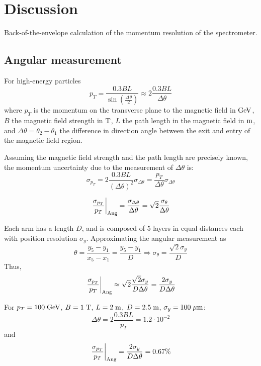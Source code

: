 \documentclass[a4paper,11pt,twoside]{article}
\begin{document}
\section{Discussion}
Back-of-the-envelope calculation of the momentum resolution of the spectrometer.

\subsection{Angular measurement}

For high-energy particles
\begin{equation}
  p_T =\frac{0.3BL}{\sin\left(\frac{\Delta\theta}{2}\right)}\approx 2\frac{0.3BL}{\Delta\theta}
\end{equation}
where $p_T$ is the momentum on the transverse plane to the magnetic
field in ${\rm GeV}$, $B$ the magnetic field strength in ${\rm T}$,
$L$ the path length in the magnetic field in ${\rm m}$, and
$\Delta\theta=\theta_{2}-\theta_{1}$ the difference in direction angle
between the exit and entry of the magnetic field region.

Assuming the magnetic field strength and the path length are precisely known,
the momentum uncertainty due to the measurement of $\Delta\theta$ is:
\begin{equation}
  \sigma_{p_T} = 2\frac{0.3BL}{\left(\Delta\theta\right)^2}\sigma_{\Delta\theta} =
    \frac{p_T}{\Delta\theta}\sigma_{\Delta\theta}
\end{equation}

\begin{equation}
  \left.\frac{\sigma_{p_T}}{p_T}\right|_{\rm Ang}= \frac{\sigma_{\Delta\theta}}{\Delta\theta} =\sqrt{2}\frac{\sigma_\theta}{\Delta\theta}
\end{equation}

Each arm has a length $D$, and is composed of 5 layers in equal distances each with position resolution $\sigma_y$.
Approximating the angular measurement as
\begin{equation}
  \theta=\frac{y_5-y_1}{x_5-x_1}=\frac{y_5-y_1}{D}\Rightarrow \sigma_\theta=\frac{\sqrt{2}\sigma_y}{D}
\end{equation}
Thus,
\begin{equation}
  \left.\frac{\sigma_{p_T}}{p_T}\right|_{\rm Ang}\approx \sqrt{2}\frac{\sqrt{2}\sigma_y}{D\Delta\theta}
  = \frac{2\sigma_y}{D\Delta\theta}
\end{equation}

For $p_T=100\;{\rm GeV}$, $B=1\;{\rm T}$, $L=2\;{\rm m}$, $D=2.5\;{\rm m}$, $\sigma_y=100\;{\rm \mu m}$:
\begin{equation}
  \Delta\theta = 2\frac{0.3BL}{p_T}=1.2\cdot 10^{-2}
\end{equation}
and
\begin{equation}
  \left.\frac{\sigma_{p_T}}{p_T}\right|_{\rm Ang}= \frac{2\sigma_y}{D\Delta\theta}=0.67\%
\end{equation}
\end{document}

